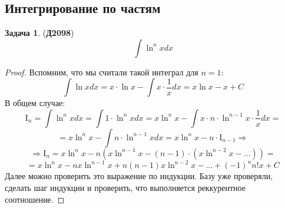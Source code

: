 \documentclass[12pt]{article}
\newcommand{\MI}{\mathrm{I}}
\theoremstyle{definition}
\newtheorem{problem}{Задача}
\DeclareMathOperator{\dint}{\displaystyle\int}
\begin{document}
\subsection*{Интегрирование по частям}

\begin{problem}(\textbf{Д2098})
	$$
		\dint \ln^n{x}dx
	$$
\end{problem}
\begin{proof}
	Вспомним, что мы считали такой интеграл для $n=1$:
	$$
		\dint \ln{x} dx = x{\cdot}\ln{x} - \dint x{\cdot}\dfrac{1}{x}dx = x\ln{x} - x + C
	$$
	В общем случае:
	$$
		\MI_n = \dint \ln^n{x}dx = \dint 1{\cdot}\ln^n{x}dx = x \ln^{n}{x} - \dint x{\cdot}n{\cdot}\ln^{n-1}{x}{\cdot}\dfrac{1}{x}dx = 
	$$
	$$
		= x \ln^{n}{x} - \dint n{\cdot}\ln^{n-1}{x}dx = x \ln^{n}{x} - n{\cdot}\MI_{n-1} \Rightarrow
	$$
	$$
		\Rightarrow \MI_n = x \ln^n{x} - n\left(x \ln^{n-1}{x} - (n-1){\cdot}\left(x\ln^{n-2}{x} - \dotsc \right)\right) = 
	$$
	$$	
		= x\ln^n{x} - nx\ln^{n-1}{x} + n(n-1)x\ln^{n-2}{x} - \dotsc + (-1)^nn!x + C
	$$
	Далее можно проверить это выражение по индукции. Базу уже проверяли, сделать шаг индукции и проверить, что выполняется реккурентное соотношение.
\end{proof}
\end{document}
